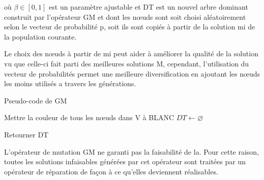 \begin{enumerate}[label=\alph*)]
où $\beta \in [0, 1]$ est un paramètre ajustable et DT est un nouvel arbre dominant construit par l'opérateur GM et dont les nœuds sont soit choisi aléatoirement selon le vecteur de probabilité p, soit ils sont copiés à partir  de la solution mi de la population courante. 

Le choix des nœuds à partir de mi peut aider à améliorer la qualité de la solution vu que celle-ci fait parti des meilleures solutions M, cependant, l’utilisation du vecteur de probabilités permet une meilleure diversification en ajoutant les nœuds les moins utilisés a travers les générations.

\begin{algorithm}[H]
\caption{Pseudo-code de GM}
\label{alg3:PCGM}
\large
{}


Mettre la couleur de tous les nœuds dans V à BLANC \;
$ DT \gets \varnothing $ \;

\end{algorithm}


\begin{algorithm*}
\large
{}

Retourner DT \;

\end{algorithm*}


L’opérateur de mutation GM ne garanti pas la faisabilité de la. Pour cette raison,  toutes les solutions infaisables générées par cet opérateur sont traitées par un opérateur de réparation de façon à ce qu’elles deviennent réalisables.



\end{enumerate}
